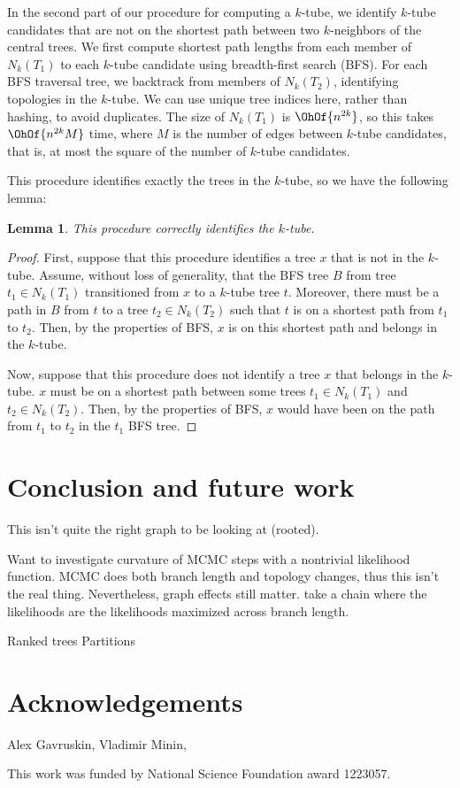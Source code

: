 \documentclass{amsart}
\newtheorem{lemma}[theorem]{Lemma}
\begin{document}
In the second part of our procedure for computing a $k$-tube, we identify $k$-tube candidates that are not on the shortest path between two $k$-neighbors of the central trees.
We first compute shortest path lengths from each member of $N_k(T_1)$ to each $k$-tube candidate using breadth-first search (BFS).
For each BFS traversal tree, we backtrack from members of $N_k(T_2)$, identifying topologies in the $k$-tube.
We can use unique tree indices here, rather than hashing, to avoid duplicates.
The size of $N_k(T_1)$ is $\OhOf{n^{2k}}$, so this takes
$\OhOf{ n^{2k} M}$ time, where $M$ is the number of edges between $k$-tube candidates, that is, at most the square of the number of $k$-tube candidates.

This procedure identifies exactly the trees in the $k$-tube, so we have the following lemma:
\begin{lemma}
	\label{lem:k_tube_correctness}
	This procedure correctly identifies the $k$-tube.
\end{lemma}
\begin{proof}
	First, suppose that this procedure identifies a tree $x$ that is not in the $k$-tube.
	Assume, without loss of generality, that the BFS tree $B$ from tree $t_1 \in N_k(T_1)$ transitioned from $x$ to a $k$-tube tree $t$.
	Moreover, there must be a path in $B$ from $t$ to a tree $t_2 \in N_k(T_2)$ such that $t$ is on a shortest path from $t_1$ to $t_2$.
	Then, by the properties of BFS, $x$ is on this shortest path and belongs in the $k$-tube.

	Now, suppose that this procedure does not identify a tree $x$ that belongs in the $k$-tube.
	$x$ must be on a shortest path between some trees $t_1 \in N_k(T_1)$ and $t_2 \in N_k(T_2)$.
	Then, by the properties of BFS, $x$ would have been on the path from $t_1$ to $t_2$ in the $t_1$ BFS tree.
\end{proof}

\section{Conclusion and future work}
This isn't quite the right graph to be looking at (rooted).

Want to investigate curvature of MCMC steps with a nontrivial likelihood function.
MCMC does both branch length and topology changes, thus this isn't the real thing.
Nevertheless, graph effects still matter.
\cite{Stefankovic2011-hu} take a chain where the likelihoods are the likelihoods maximized across branch length.

Ranked trees \cite{Song2006-xe}
Partitions \cite{Gusfield2002-il}


\section{Acknowledgements}
Alex Gavruskin,
Vladimir Minin,

This work was funded by National Science Foundation award 1223057.



\end{document}
